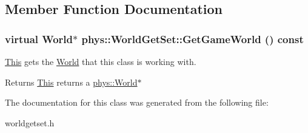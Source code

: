 \subsection{Member Function Documentation}
\hypertarget{classphys_1_1WorldGetSet_ae11f48a9152834423647ea44e7fd7ee5}{
\subsubsection[{GetGameWorld}]{\setlength{\rightskip}{0pt plus 5cm}virtual {\bf World}$\ast$ phys::WorldGetSet::GetGameWorld () const}}
\label{dc/d4f/classphys_1_1WorldGetSet_ae11f48a9152834423647ea44e7fd7ee5}


\hyperlink{structThis}{This} gets the \hyperlink{classphys_1_1World}{World} that this class is working with. 

\begin{DoxyReturn}{Returns}
\hyperlink{structThis}{This} returns a \hyperlink{classphys_1_1World}{phys::World}$\ast$ 
\end{DoxyReturn}


The documentation for this class was generated from the following file:\begin{DoxyCompactItemize}
\item 
worldgetset.h\end{DoxyCompactItemize}
